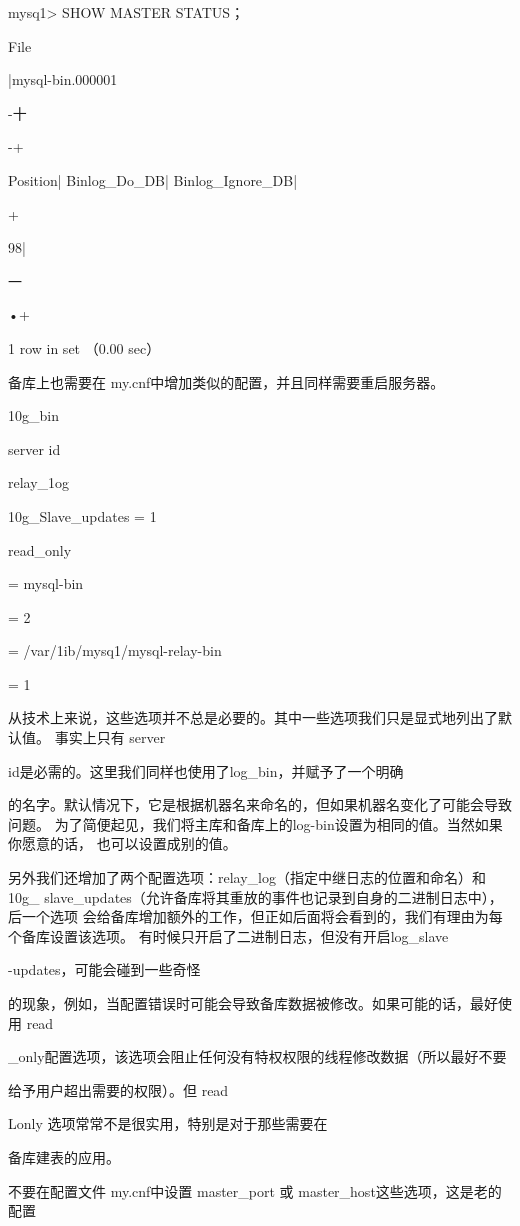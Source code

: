 mysq1> SHOW MASTER STATUS；

File

|mysql-bin.000001

-十

-+

Position| Binlog\_Do\_DB| Binlog\_Ignore\_DB|

+

98|

一

•+

1 row in set （0.00 sec）

备库上也需要在 my.cnf中增加类似的配置，并且同样需要重启服务器。

10g\_bin

server id

relay\_1og

10g\_Slave\_updates = 1

read\_only

= mysql-bin

= 2

= /var/1ib/mysq1/mysql-relay-bin

= 1

从技术上来说，这些选项并不总是必要的。其中一些选项我们只是显式地列出了默认值。
事实上只有 server

id是必需的。这里我们同样也使用了log\_bin，并赋予了一个明确

的名字。默认情况下，它是根据机器名来命名的，但如果机器名变化了可能会导致问题。
为了简便起见，我们将主库和备库上的log-bin设置为相同的值。当然如果你愿意的话，
也可以设置成别的值。

另外我们还增加了两个配置选项：relay\_log（指定中继日志的位置和命名）和10g\_
slave\_updates（允许备库将其重放的事件也记录到自身的二进制日志中），后一个选项
会给备库增加额外的工作，但正如后面将会看到的，我们有理由为每个备库设置该选项。
有时候只开启了二进制日志，但没有开启log\_slave

-updates，可能会碰到一些奇怪

的现象，例如，当配置错误时可能会导致备库数据被修改。如果可能的话，最好使用
read

\_only配置选项，该选项会阻止任何没有特权权限的线程修改数据（所以最好不要

给予用户超出需要的权限）。但 read

Lonly 选项常常不是很实用，特别是对于那些需要在

备库建表的应用。

不要在配置文件 my.cnf中设置 master\_port 或 master\_host这些选项，这是老的配置

